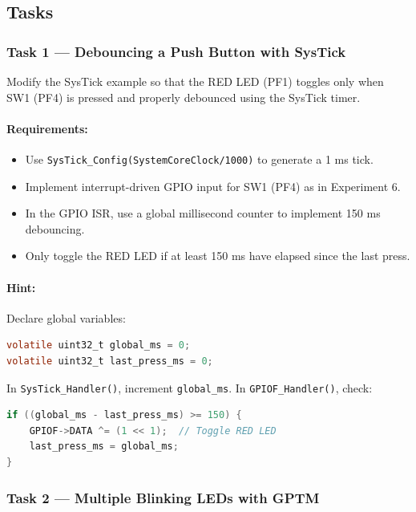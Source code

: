 \newpage
\subsection{Tasks}

\subsubsection{Task 1 — Debouncing a Push Button with SysTick}

Modify the SysTick example so that the RED LED (PF1) toggles only when SW1 (PF4) is pressed and properly debounced using the SysTick timer.

\paragraph{Requirements:}
\begin{itemize}[nosep]
  \item Use \texttt{SysTick\_Config(SystemCoreClock/1000)} to generate a 1 ms tick.
  \item Implement interrupt-driven GPIO input for SW1 (PF4) as in Experiment 6.
  \item In the GPIO ISR, use a global millisecond counter to implement 150 ms debouncing.
  \item Only toggle the RED LED if at least 150 ms have elapsed since the last press.
\end{itemize}

\paragraph{Hint:}
Declare global variables:
\begin{lstlisting}[language=C]
volatile uint32_t global_ms = 0;
volatile uint32_t last_press_ms = 0;
\end{lstlisting}

\noindent
In \texttt{SysTick\_Handler()}, increment \texttt{global\_ms}. In \texttt{GPIOF\_Handler()}, check:
\begin{lstlisting}[language=C]
if ((global_ms - last_press_ms) >= 150) {
    GPIOF->DATA ^= (1 << 1);  // Toggle RED LED
    last_press_ms = global_ms;
}
\end{lstlisting}

\subsubsection{Task 2 — Multiple Blinking LEDs with GPTM}

